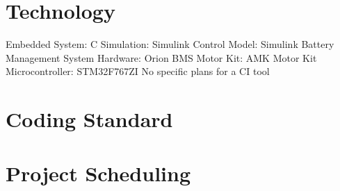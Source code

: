 \documentclass{article}
\begin{document}
\section{Technology}
Embedded System: C
Simulation: Simulink
Control Model: Simulink
Battery Management System Hardware: Orion BMS
Motor Kit: AMK Motor Kit
Microcontroller: STM32F767ZI
No specific plans for a CI tool

\section{Coding Standard}

\section{Project Scheduling}
\end{document}
